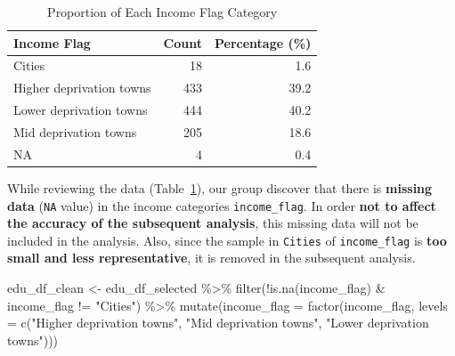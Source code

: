 \documentclass[11pt,en]{../resources/elegantpaper}
\newenvironment{Shaded}{\begin{snugshade}}{\end{snugshade}}
\newcommand{\AttributeTok}[1]{\textcolor[rgb]{0.77,0.63,0.00}{#1}}
\newcommand{\FunctionTok}[1]{\textcolor[rgb]{0.00,0.00,0.81}{#1}}
\newcommand{\NormalTok}[1]{#1}
\newcommand{\OtherTok}[1]{\textcolor[rgb]{0.50,0.00,0.50}{#1}}
\newcommand{\SpecialCharTok}[1]{\textcolor[rgb]{0.00,0.00,0.00}{#1}}
\newcommand{\StringTok}[1]{\textcolor[rgb]{0.31,0.60,0.02}{#1}}
\begin{document}
\begin{longtable}[]{@{}lrr@{}}

\caption{\label{tbl-proportion_of_income}Proportion of Each Income Flag
Category}

\tabularnewline

\toprule\noalign{}
Income Flag & Count & Percentage (\%) \\
\midrule\noalign{}
\endhead
\bottomrule\noalign{}
\endlastfoot
Cities & 18 & 1.6 \\
Higher deprivation towns & 433 & 39.2 \\
Lower deprivation towns & 444 & 40.2 \\
Mid deprivation towns & 205 & 18.6 \\
NA & 4 & 0.4 \\

\end{longtable}

While reviewing the data (Table~\ref{tbl-proportion_of_income}), our
group discover that there is \textbf{missing data} (\texttt{NA} value)
in the income categories \texttt{income\_flag}. In order \textbf{not to
affect the accuracy of the subsequent analysis}, this missing data will
not be included in the analysis. Also, since the sample in
\texttt{Cities} of \texttt{income\_flag} is \textbf{too small and less
representative}, it is removed in the subsequent analysis.

\begin{Shaded}
\begin{Highlighting}[]
\NormalTok{edu\_df\_clean }\OtherTok{\textless{}{-}}\NormalTok{ edu\_df\_selected }\SpecialCharTok{\%\textgreater{}\%}
  \FunctionTok{filter}\NormalTok{(}\SpecialCharTok{!}\FunctionTok{is.na}\NormalTok{(income\_flag) }\SpecialCharTok{\&}\NormalTok{ income\_flag }\SpecialCharTok{!=} \StringTok{"Cities"}\NormalTok{) }\SpecialCharTok{\%\textgreater{}\%}
  \FunctionTok{mutate}\NormalTok{(}\AttributeTok{income\_flag =} \FunctionTok{factor}\NormalTok{(income\_flag,}
                              \AttributeTok{levels =} \FunctionTok{c}\NormalTok{(}\StringTok{"Higher deprivation towns"}\NormalTok{,}
                                         \StringTok{"Mid deprivation towns"}\NormalTok{,}
                                         \StringTok{"Lower deprivation towns"}\NormalTok{)))}
\end{Highlighting}
\end{Shaded}
\end{document}
